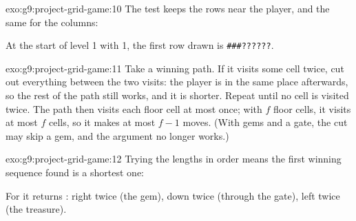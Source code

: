 \begin{solution}{exo:g9:project-grid-game:10}
The test  keeps the rows near the player,
and the same for the columns:

\label{lst:g9:project-grid-game:sol-fog}

At the start of level 1 with  1, the first row drawn is
\texttt{\#\#\#??????}.
\end{solution}

\begin{solution}{exo:g9:project-grid-game:11}
Take a winning path. If it visits some cell twice, cut out everything between
the two visits: the player is in the same place afterwards, so the rest of the
path still works, and it is shorter. Repeat until no cell is visited twice.
The path then visits each floor cell at most once; with $f$ floor cells, it
visits at most $f$ cells, so it makes at most $f - 1$ moves. (With gems and a
gate, the cut may skip a gem, and the argument no longer works.)
\end{solution}

\begin{solution}{exo:g9:project-grid-game:12}
Trying the lengths in order means the first winning sequence found is a
shortest one:

\label{lst:g9:project-grid-game:sol-shortest}

For  it returns : right twice (the gem), down twice
(through the gate), left twice (the treasure).
\end{solution}
